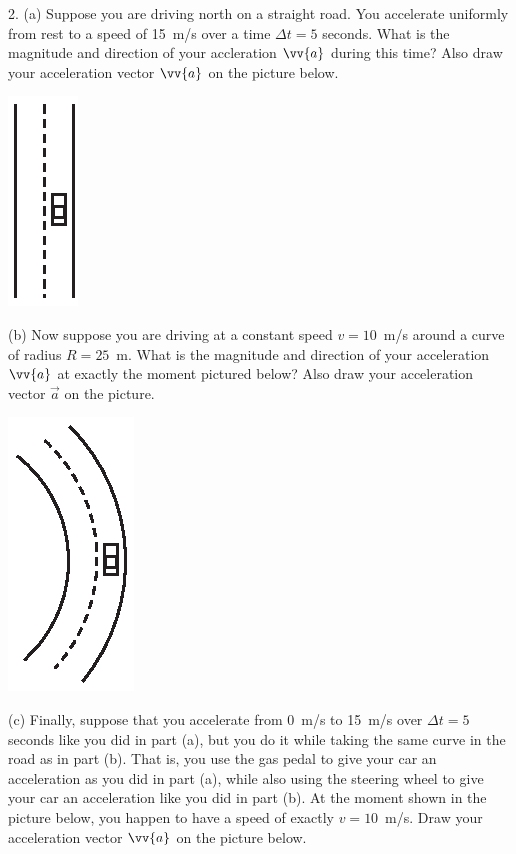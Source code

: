 2.  (a) Suppose you are driving north on a straight road.  You accelerate uniformly from rest to a speed of 15~m/s over a time $\Delta t = 5$ seconds.  What is the magnitude and direction of your accleration $\vv{a}$ during this time?  Also draw your acceleration vector $\vv{a}$ on the picture below.

\hspace{1.0in}\includegraphics{tangential_and_centripetal_acc/straight.eps}

(b) Now suppose you are driving at a constant speed $v=10$~m/s around a curve of radius $R=25$~m.  What is the magnitude and direction of your acceleration $\vv{a}$ at exactly the moment pictured below?  Also draw your acceleration vector $\vec{a}$ on the picture.

\hspace{1.0in}\includegraphics{tangential_and_centripetal_acc/curve2.eps}

\pagebreak[3]
(c) Finally, suppose that you 
accelerate from 0~m/s to 15~m/s over $\Delta t = 5$ seconds like you did in part (a), but you do it while taking the same curve in the road as in part (b).  That is, you use the gas pedal to give your car an acceleration as you did in part (a), while also using the steering wheel to give your car an acceleration like you did in part (b). At the moment shown in the picture below, you happen to have a speed of exactly $v=10$~m/s.  Draw your acceleration vector $\vv{a}$ on the picture below.

